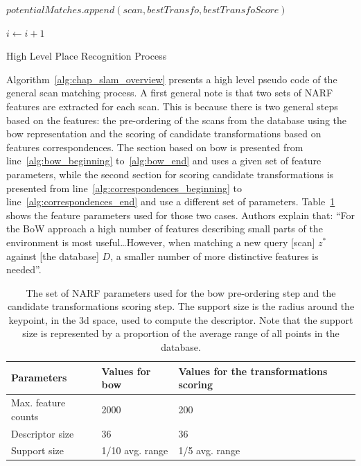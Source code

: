 \begin{algorithm}
\begin{algorithmic}[1]
        \State
        \State $potentialMatches.append(scan, bestTransfo, bestTransfoScore)$
        \EndIf

        \State
        \State $i \gets i+1$
        \EndWhile \label{alg:correspondences_end}

        \State
        \State {}
        \EndFunction
    \end{algorithmic}

    \caption{High Level Place Recognition Process~\citep{Steder2011b}}
    \label{alg:chap_slam_overview}
\end{algorithm}

Algorithm~\ref{alg:chap_slam_overview} presents a high level pseudo code of the general scan matching process. A first general note is that two sets of NARF features are extracted for each scan. This is because there is two general steps based on the features: the pre-ordering of the scans from the database using the \gls*{bow} representation and the scoring of candidate transformations based on features correspondences. The section based on \gls*{bow} is presented from line~\ref{alg:bow_beginning} to~\ref{alg:bow_end} and uses a given set of feature parameters, while the second section for scoring candidate transformations is presented from line~\ref{alg:correspondences_beginning} to line~\ref{alg:correspondences_end} and use a different set of parameters. Table~\ref{tab:chap_slam_narf_parameters} shows the feature parameters used for those two cases. Authors explain that: \enquote{For the BoW approach a high number of features describing small parts of the environment is most useful\dots However, when matching a new query [scan] $z^*$ against [the database] $D$, a smaller number of more distinctive features is needed}.

\begin{table}
    \centering
    \begin{tabular}{@{}lll@{}}
        \toprule
        \textbf{Parameters}  & \textbf{Values for \gls*{bow}} & \textbf{Values for the transformations scoring} \\
        \hline
        Max. feature counts & 2000                          & 200                                \\
        Descriptor size     & 36                            & 36                                 \\
        Support size        & 1/10 avg. range               & 1/5 avg. range                     \\
        \bottomrule
    \end{tabular}
    \caption[The set of NARF parameters used for the \gls*{bow} pre-ordering step and the candidate transformations scoring step.]{The set of NARF parameters used for the \gls*{bow} pre-ordering step and the candidate transformations scoring step. The support size is the radius around the keypoint, in the \gls*{3d} space, used to compute the descriptor. Note that the support size is represented by a proportion of the average range of all points in the database.}
    \label{tab:chap_slam_narf_parameters}
\end{table}

